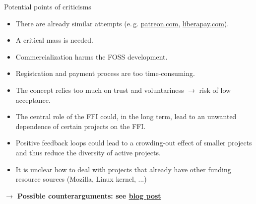 \documentclass[t]{beamer}
\newcommand{\cst}[1]{{\usebeamercolor[fg]{structure}#1}}
\begin{document}
\begin{frame}[label=cm70]{\cst{Potential points of criticisms}}
\begin{itemize}
 \item There are already similar attempts (e.\,g. \href{https://patreon.com}{patreon.com}, \href{https://liberapay.com/}{liberapay.com}).

\item A critical mass is needed.

\item Commercialization harms the FOSS development.

\item Registration and payment process are too time-consuming.

\item The concept relies too much on trust and voluntariness $\rightarrow$ risk of low acceptance.

\item The central role of the FFI could, in the long term, lead to an unwanted dependence of certain projects on the FFI.

\item Positive feedback loops could lead to a crowding-out effect of smaller projects and thus reduce the diversity of active projects.

\item It is unclear how to deal with projects that already have other funding resource sources (Mozilla, Linux kernel, ...)

\end{itemize}
\medskip
\pause
\begin{center}
\textbf{$\rightarrow$ Possible counterarguments: see \href{https://fsfw-dresden.de/2018/11/funding-foss-en.html\#criticism}{blog post}}
\end{center}

\end{frame}
\end{document}
